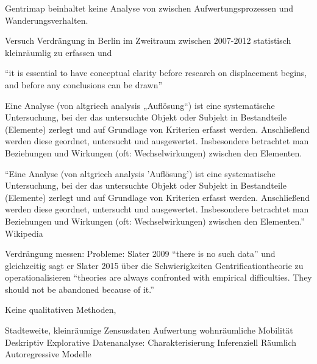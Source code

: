 \begin{itemize}
Gentrimap beinhaltet keine Analyse von zwischen Aufwertungsprozessen und Wanderungsverhalten.

Versuch Verdrängung in Berlin im Zweitraum zwischen 2007-2012 statistisch kleinräumlig zu erfassen und 


"`it is essential to have conceptual clarity before research on displacement begins, and before any conclusions can be drawn"' \citet[S.~304]{Slater2009}

Eine Analyse (von altgriech analysis „Auflösung“) ist eine systematische Untersuchung, bei der das untersuchte Objekt oder Subjekt in Bestandteile (Elemente) zerlegt und auf Grundlage von Kriterien erfasst werden. Anschließend werden diese geordnet, untersucht und ausgewertet. Insbesondere betrachtet man Beziehungen und Wirkungen (oft: Wechselwirkungen) zwischen den Elementen.

"`Eine Analyse (von altgriech analysis 'Auflösung') ist eine systematische Untersuchung, bei der das untersuchte Objekt oder Subjekt in Bestandteile (Elemente) zerlegt und auf Grundlage von Kriterien erfasst werden. Anschließend werden diese geordnet, untersucht und ausgewertet. Insbesondere betrachtet man Beziehungen und Wirkungen (oft: Wechselwirkungen) zwischen den Elementen."' Wikipedia



Verdrängung messen:
Probleme: Slater 2009 "`there is no such data"' und gleichzeitig sagt er Slater 2015 über die Schwierigkeiten Gentrificationtheorie zu operationalisieren "`theories are always confronted with empirical difficulties. They should not be abandoned because of it."'


Keine qualitativen Methoden, 

Stadteweite, kleinräumige Zensusdaten Aufwertung wohnräumliche Mobilität
Deskriptiv Explorative Datenanalyse: Charakterisierung  
Inferenziell Räumlich Autoregressive Modelle


\end{itemize}
